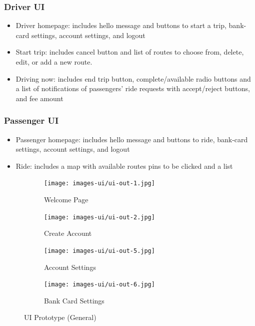 \documentclass{BusMateSRS}
\begin{document}
\subsubsection{Driver UI}
\begin{itemize}
	\item Driver homepage:
	      includes hello message and buttons to start a trip, bank-card settings,
	      account settings, and logout
	\item Start trip:
	      includes cancel button and list of routes to choose from, delete, edit,
	      or add a new route.
	\item Driving now:
	      includes end trip button, complete/available radio buttons and
	      a list of notifications of passengers'
	      ride requests with accept/reject buttons, and fee amount
\end{itemize}

\subsubsection{Passenger UI}
\begin{itemize}
	\item Passenger homepage:
	      includes hello message and buttons to ride, bank-card settings,
	      account settings, and logout
	\item Ride:
	      includes a map with available routes pins to be clicked and a list
\end{itemize}

\begin{figure}[ht!]
	\centering
	\begin{subfigure}[b]{0.3\textwidth}
		\centering
		\texttt{[image: images-ui/ui-out-1.jpg]}
		\caption{Welcome Page}
		\label{fig:ui1}
	\end{subfigure}
	\hfill
	\begin{subfigure}[b]{0.3\textwidth}
		\centering
		\texttt{[image: images-ui/ui-out-2.jpg]}
		\caption{Create Account}
		\label{fig:ui2}
	\end{subfigure}
	\hfill
	\begin{subfigure}[b]{0.3\textwidth}
		\centering
		\texttt{[image: images-ui/ui-out-5.jpg]}
		\caption{Account Settings}
		\label{fig:ui5}
	\end{subfigure}
	\hfill
	\begin{subfigure}[b]{0.3\textwidth}
		\centering
		\texttt{[image: images-ui/ui-out-6.jpg]}
		\caption{Bank Card Settings}
		\label{fig:ui6}
	\end{subfigure}
	\caption{UI Prototype (General)}
	\label{fig:ui-prototype1}
\end{figure}
\end{document}
